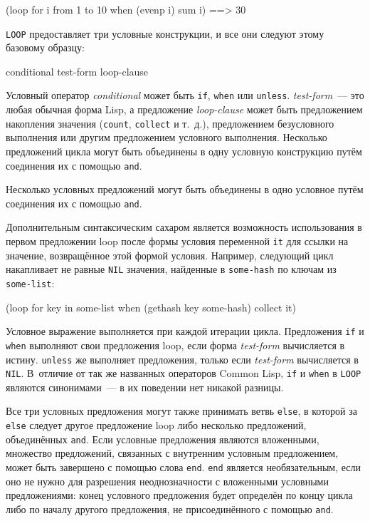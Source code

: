 \begin{myverb}
(loop for i from 1 to 10 when (evenp i) sum i) ==> 30
\end{myverb}

\lstinline{LOOP} предоставляет три условные конструкции, и все они следуют этому базовому образцу:

\begin{myverb}
conditional test-form loop-clause
\end{myverb}

Условный оператор \textit{conditional} может быть \lstinline{if}, \lstinline{when} или
\lstinline{unless}. \textit{test-form}~--- это любая обычная форма Lisp, а предложение
\textit{loop-clause} может быть предложением накопления значения (\lstinline{count},
\lstinline{collect} и т.~д.), предложением безусловного выполнения или другим предложением
условного выполнения. Несколько предложений цикла могут быть объединены в одну условную
конструкцию путём соединения их с помощью \lstinline{and}.

Несколько условных предложений могут быть объединены в одно условное путём соединения их
с помощью \lstinline{and}.

Дополнительным синтаксическим сахаром является возможность использования в первом
предложении loop после формы условия переменной \lstinline{it} для ссылки на значение,
возвращённое этой формой условия. Например, следующий цикл накапливает не равные
\lstinline{NIL} значения, найденные в \lstinline{some-hash} по ключам из \lstinline{some-list}:

\begin{myverb}
(loop for key in some-list when (gethash key some-hash) collect it)
\end{myverb}

Условное выражение выполняется при каждой итерации цикла. Предложения \lstinline{if} и
\lstinline{when} выполняют свои предложения loop, если форма \textit{test-form} вычисляется в
истину. \lstinline{unless} же выполняет предложения, только если \textit{test-form} вычисляется
в \lstinline{NIL}. В~отличие от так же названных операторов Common Lisp, \lstinline{if} и
\lstinline{when} в \lstinline{LOOP} являются синонимами~--- в их поведении нет никакой разницы.

Все три условных предложения могут также принимать ветвь \lstinline{else}, в которой за
\lstinline{else} следует другое предложение loop либо несколько предложений, объединённых
\lstinline{and}. Если условные предложения являются вложенными, множество предложений,
связанных с внутренним условным предложением, может быть завершено с помощью слова
\lstinline{end}. \lstinline{end} является необязательным, если оно не нужно для разрешения
неоднозначности с вложенными условными предложениями: конец условного предложения будет
определён по концу цикла либо по началу другого предложения, не присоединённого с помощью
\lstinline{and}.

